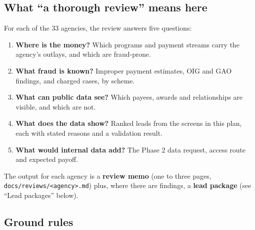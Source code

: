 \documentclass[letterpaper,11pt]{article}
\providecommand{\tightlist}{\setlength{\itemsep}{0pt}\setlength{\parskip}{0pt}}
\begin{document}
\hypertarget{what-a-thorough-review-means-here}{%
\subsection{What ``a thorough review'' means
here}\label{what-a-thorough-review-means-here}}

For each of the 33 agencies, the review answers five questions:

\begin{enumerate}
\def\labelenumi{\arabic{enumi}.}
\tightlist
\item
  \textbf{Where is the money?} Which programs and payment streams carry
  the agency's outlays, and which are fraud-prone.
\item
  \textbf{What fraud is known?} Improper payment estimates, OIG and GAO
  findings, and charged cases, by scheme.
\item
  \textbf{What can public data see?} Which payees, awards and
  relationships are visible, and which are not.
\item
  \textbf{What does the data show?} Ranked leads from the screens in
  this plan, each with stated reasons and a validation result.
\item
  \textbf{What would internal data add?} The Phase 2 data request,
  access route and expected payoff.
\end{enumerate}

The output for each agency is a \textbf{review memo} (one to three
pages, \texttt{docs/reviews/\textless{}agency\textgreater{}.md}) plus,
where there are findings, a \textbf{lead package} (see ``Lead packages''
below).

\hypertarget{ground-rules}{%
\subsection{Ground rules}\label{ground-rules}}
\end{document}
